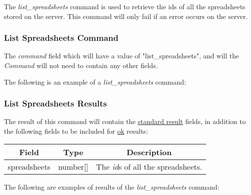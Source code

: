 The \emph{list\_spreadsheets} command is used to retrieve the ids of all the 
spreadsheets stored on the server. This command will only fail if an error 
occurs on the server.

\subsubsection{List Spreadsheets Command}
The \emph{command} field which will have a value of "list\_spreadsheets", and will the \emph{Command} will not need to contain any other fields.

The following is an example of a \emph{list\_spreadsheets} command:


\subsubsection{List Spreadsheets Results}
The result of this command will contain the \hyperref[sec:message:result]{standard result} fields, in addition to the following fields to be included for \underline{ok} results:
\begin{table}[H]
    \begin{center}
        \begin{tabular}{|c|c|c|}\hline
            Field & Type & Description \\\hline
            spreadsheets & number[] & The \emph{id}s of all the spreadsheets. \\\hline
        \end{tabular}
    \end{center}
\end{table}

The following are examples of results of the \emph{list\_spreadsheets} command:




